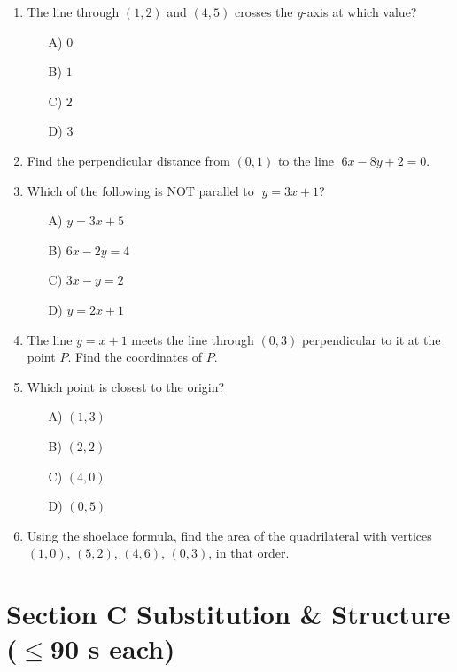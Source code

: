 \documentclass[11pt,a4paper]{article}
\begin{document}
\begin{enumerate}
\item The line through $(1,2)$ and $(4,5)$ crosses the $y$-axis at which value?
\begin{itemize}
\item[A)] $0$
\item[B)] $1$
\item[C)] $2$
\item[D)] $3$
\end{itemize}

\item Find the perpendicular distance from $(0,1)$ to the line $\;6x - 8y + 2 = 0$.

\item Which of the following is NOT parallel to $\;y = 3x + 1$?
\begin{itemize}
\item[A)] $y = 3x + 5$
\item[B)] $6x - 2y = 4$
\item[C)] $3x - y = 2$
\item[D)] $y = 2x + 1$
\end{itemize}

\item The line $y = x + 1$ meets the line through $(0,3)$ perpendicular to it at the point $P$. Find the coordinates of $P$.

\item Which point is closest to the origin?
\begin{itemize}
\item[A)] $(1,3)$
\item[B)] $(2,2)$
\item[C)] $(4,0)$
\item[D)] $(0,5)$
\end{itemize}

\item Using the shoelace formula, find the area of the quadrilateral with vertices $(1,0)$, $(5,2)$, $(4,6)$, $(0,3)$, in that order.

\end{enumerate}

\section*{Section C \quad Substitution \& Structure \hfill{\normalfont\small($\leq$90 s each)}}
\end{document}
